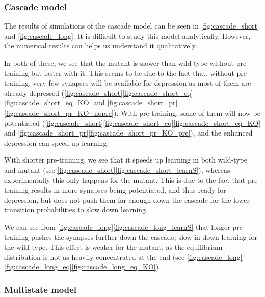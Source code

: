 \documentclass[12pt]{article}
\begin{document}
\subsubsection{Cascade model}\label{sec:cascade}





The results of simulations of the cascade model can be seen in \autoref{fig:cascade_short} and \autoref{fig:cascade_long}.
It is difficult to study this model analytically.
However, the numerical results can helps us understand it qualitatively.

In both of these, we see that the mutant is slower than wild-type without pre-training but faster with it.
This seems to be due to the fact that, without pre-training, very few synapses will be available for depression as most of them are already depressed (\autoref{fig:cascade_short}\ref{fig:cascade_short_eq}\ref{fig:cascade_short_eq_KO} and \ref{fig:cascade_short_pr}\ref{fig:cascade_short_pr_KO_nopre}).
With pre-training, some of them will now be potentiated (\autoref{fig:cascade_short}\ref{fig:cascade_short_eq}\ref{fig:cascade_short_eq_KO} and \ref{fig:cascade_short_pr}\ref{fig:cascade_short_pr_KO_pre}), and the enhanced depression can speed up learning.

With shorter pre-training, we see that it speeds up learning in both wild-type and mutant (see \autoref{fig:cascade_short}\ref{fig:cascade_short_learnS}), whereas experimentally this only happens for the mutant.
This is due to the fact that pre-training results in more synapses being potentiated, and thus ready for depression, but does not push them far enough down the cascade for the lower transition probabilities to slow down learning.

We can see from \autoref{fig:cascade_long}\ref{fig:cascade_long_learnS} that longer pre-training pushes the synapses further down the cascade, slow in down learning for the wild-type.
This effect is weaker for the mutant, as the equilibrium distribution is not as heavily concentrated at the end (see \autoref{fig:cascade_long}\ref{fig:cascade_long_eq}\ref{fig:cascade_long_eq_KO}).


\subsubsection{Multistate model}\label{sec:multistate}
\end{document}
